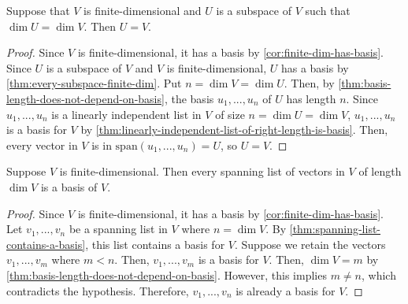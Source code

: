 \documentclass{article}
\begin{document}
\begin{theorem}
  \label{thm:subspace-of-full-dimension-equals-whole-space}
  Suppose that $V$ is finite-dimensional and $U$ is a subspace of $V$
  such that $\dim U = \dim V$. Then $U = V$.
\end{theorem}
\begin{proof}
  Since $V$ is finite-dimensional, it has a basis by
  \cref{cor:finite-dim-has-basis}. Since $U$ is a subspace of $V$ and
  $V$ is finite-dimensional, $U$ has a basis by
  \cref{thm:every-subspace-finite-dim}. Put $n = \dim V = \dim
  U$. Then, by \cref{thm:basis-length-does-not-depend-on-basis}, the
  basis $u_1, ..., u_n$ of $U$ has length $n$. Since $u_1, ..., u_n$
  is a linearly independent list in $V$ of size $n = \dim U = \dim V$,
  $u_1, ..., u_n$ is a basis for $V$ by
  \cref{thm:linearly-independent-list-of-right-length-is-basis}. Then,
  every vector in $V$ is in $\text{span}(u_1, ..., u_n) = U$, so
  $U = V$.
\end{proof}

\begin{theorem}
  \label{thm:spanning-list-of-right-length-is-a-basis}
  Suppose $V$ is finite-dimensional. Then every spanning list of
  vectors in $V$ of length $\dim V$ is a basis of $V$.
\end{theorem}
\begin{proof}
  Since $V$ is finite-dimensional, it has a basis by
  \cref{cor:finite-dim-has-basis}. Let $v_1, ..., v_n$ be a spanning
  list in $V$ where $n = \dim V$. By
  \cref{thm:spanning-list-contains-a-basis}, this list contains a
  basis for $V$. Suppose we retain the vectors $v_1, ..., v_m$ where $m <
  n$. Then, $v_1, ..., v_m$ is a basis for $V$. Then, $\dim V = m$ by
  \cref{thm:basis-length-does-not-depend-on-basis}. However, this
  implies $m \ne n$, which contradicts the hypothesis. Therefore,
  $v_1, ..., v_n$ is already a basis for $V$.
\end{proof}
\end{document}
